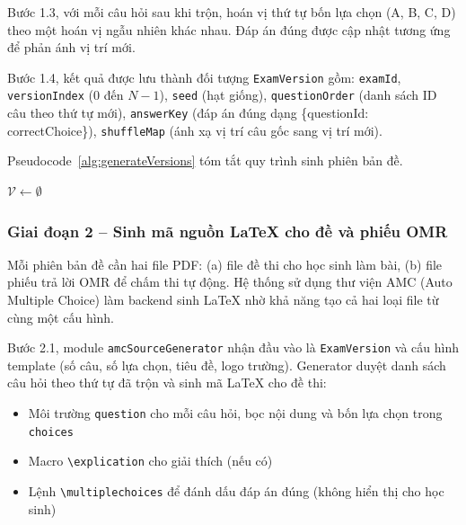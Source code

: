 ﻿\documentclass[../DoAn.tex]{subfiles}
\begin{document}
Bước 1.3, với mỗi câu hỏi sau khi trộn, hoán vị thứ tự bốn lựa chọn (A, B, C, D) theo một hoán vị ngẫu nhiên khác nhau. Đáp án đúng được cập nhật tương ứng để phản ánh vị trí mới.

Bước 1.4, kết quả được lưu thành đối tượng \texttt{ExamVersion} gồm: \texttt{examId}, \texttt{versionIndex} (0 đến $N-1$), \texttt{seed} (hạt giống), \texttt{questionOrder} (danh sách ID câu theo thứ tự mới), \texttt{answerKey} (đáp án đúng dạng \{questionId: correctChoice\}), \texttt{shuffleMap} (ánh xạ vị trí câu gốc sang vị trí mới).

Pseudocode~\ref{alg:generateVersions} tóm tắt quy trình sinh phiên bản đề.

\begin{algorithm}[H]
\caption{Sinh phiên bản đề thi}
\label{alg:generateVersions}
\SetAlgoLined
{}
 $\mathcal{V} \gets \emptyset$ \;
  \;
\end{algorithm}

\subsubsection{Giai đoạn 2 -- Sinh mã nguồn LaTeX cho đề và phiếu OMR}
Mỗi phiên bản đề cần hai file PDF: (a) file đề thi cho học sinh làm bài, (b) file phiếu trả lời OMR để chấm thi tự động. Hệ thống sử dụng thư viện AMC (Auto Multiple Choice) làm backend sinh LaTeX nhờ khả năng tạo cả hai loại file từ cùng một cấu hình.

Bước 2.1, module \texttt{amcSourceGenerator} nhận đầu vào là \texttt{ExamVersion} và cấu hình template (số câu, số lựa chọn, tiêu đề, logo trường). Generator duyệt danh sách câu hỏi theo thứ tự đã trộn và sinh mã LaTeX cho đề thi:
\begin{itemize}
  \item Môi trường \texttt{question} cho mỗi câu hỏi, bọc nội dung và bốn lựa chọn trong \texttt{choices}
  \item Macro \texttt{\textbackslash explication} cho giải thích (nếu có)
  \item Lệnh \texttt{\textbackslash multiplechoices} để đánh dấu đáp án đúng (không hiển thị cho học sinh)
\end{itemize}
\end{document}
